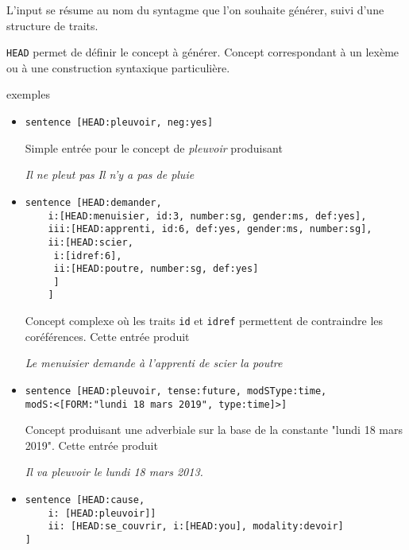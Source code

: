 \documentclass[11pt]{article}
\begin{document}
L'input se résume au nom du syntagme que l'on souhaite générer, suivi d'une
structure de traits.

\texttt{HEAD} permet de définir le concept à générer. Concept
correspondant à un lexème ou à une construction syntaxique particulière.

exemples

\begin{itemize}
\item 
\begin{verbatim}
sentence [HEAD:pleuvoir, neg:yes]
\end{verbatim}

Simple entrée pour le concept de \textit{pleuvoir} produisant 
\begin{exe}
\ex \begin{xlist} 
\ex \textit{Il ne pleut pas}
\ex \textit{Il n'y a pas de pluie}
\end{xlist}
\end{exe}


\item 
\begin{verbatim}
sentence [HEAD:demander,
    i:[HEAD:menuisier, id:3, number:sg, gender:ms, def:yes],
    iii:[HEAD:apprenti, id:6, def:yes, gender:ms, number:sg],
    ii:[HEAD:scier,
	 i:[idref:6],
	 ii:[HEAD:poutre, number:sg, def:yes]
	 ]
    ]
\end{verbatim}

Concept complexe où les traits \texttt{id} et \texttt{idref}
permettent de contraindre les coréférences. 
Cette entrée produit 

\begin{exe}
\ex \textit{Le menuisier demande à l'apprenti de scier la
poutre}
\end{exe}

\item 
\begin{verbatim}
sentence [HEAD:pleuvoir, tense:future, modSType:time, 
modS:<[FORM:"lundi 18 mars 2019", type:time]>]
\end{verbatim}

Concept produisant une adverbiale sur la base de la
constante "lundi 18 mars 2019". Cette entrée produit 

\begin{exe}
\ex \textit{Il va pleuvoir le lundi 18 mars 2013.}
\end{exe}

\item 
\begin{verbatim}
sentence [HEAD:cause, 
    i: [HEAD:pleuvoir]]
    ii: [HEAD:se_couvrir, i:[HEAD:you], modality:devoir]
]
\end{verbatim}


\end{itemize}
\end{document}
